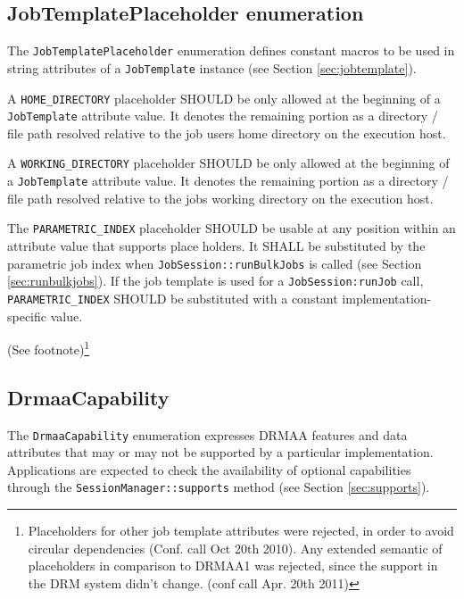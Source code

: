 \documentclass{article}
\newcommand{\h}[1]{\lstinline|#1|}
\newcommand{\rat}[1]{ {\tiny(See footnote)}\footnote{#1} }
\begin{document}
\subsection{JobTemplatePlaceholder enumeration}
\label{sec:jtplaceholders}

The \h{JobTemplatePlaceholder} enumeration defines constant macros to be used in string attributes of a \h{JobTemplate} instance (see Section \ref{sec:jobtemplate}). 



A \h{HOME_DIRECTORY} placeholder SHOULD be only allowed at the beginning of a \h{JobTemplate} attribute value. It denotes the remaining portion as a directory / file path resolved relative to the job users home directory on the execution host. 

A \h{WORKING_DIRECTORY} placeholder SHOULD be only allowed at the beginning of a \h{JobTemplate} attribute value. It denotes the remaining portion as a directory / file path resolved relative to the jobs working directory on the execution host. 

The \h{PARAMETRIC_INDEX} placeholder SHOULD be usable at any position within an attribute value that supports place holders. It SHALL be substituted by the parametric job index when \h{JobSession::runBulkJobs} is called (see Section \ref{sec:runbulkjobs}). If the job template is used for a \h{JobSession:runJob} call, \h{PARAMETRIC_INDEX} SHOULD be substituted with a constant implementation-specific value.

\rat{
Placeholders for other job template attributes were rejected, in order to avoid circular dependencies (Conf. call Oct 20th 2010). Any extended semantic of placeholders in comparison to DRMAA1 was rejected, since the support in the DRM system didn't change. (conf call Apr. 20th 2011)
}

\subsection{DrmaaCapability}
\label{sec:drmaacapability}

The \h{DrmaaCapability} enumeration expresses DRMAA features and data attributes that may or may not be supported by a particular implementation. Applications are expected to check the availability of optional capabilities through the \h{SessionManager::supports} method (see Section \ref{sec:supports}).


\end{document}

